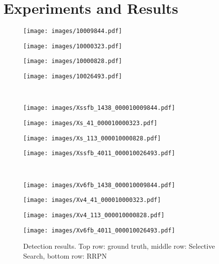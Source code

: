 \documentclass{article}
\begin{document}
\section{Experiments and Results}
\label{sec:exp}
\begin{figure*}[t]
\centering
  \begin{minipage}{0.24\linewidth}
    \texttt{[image: images/10009844.pdf]}
  \end{minipage}
  \begin{minipage}{0.24\linewidth}
    \texttt{[image: images/10000323.pdf]}
  \end{minipage}
  \begin{minipage}{0.24\linewidth}
    \texttt{[image: images/10000828.pdf]}
  \end{minipage}
  \begin{minipage}{0.24\linewidth}
    \texttt{[image: images/10026493.pdf]}
  \end{minipage}\\
  \begin{minipage}{0.24\linewidth}
    \texttt{[image: images/Xssfb\_1438\_000010009844.pdf]}
  \end{minipage}
  \begin{minipage}{0.24\linewidth}
    \texttt{[image: images/Xs\_41\_000010000323.pdf]}
  \end{minipage}
  \begin{minipage}{0.24\linewidth}
    \texttt{[image: images/Xs\_113\_000010000828.pdf]}
  \end{minipage}
  \begin{minipage}{0.24\linewidth}
    \centering
    \texttt{[image: images/Xssfb\_4011\_000010026493.pdf]}
  \end{minipage}\\
  \begin{minipage}{0.24\linewidth}
    \texttt{[image: images/Xv6fb\_1438\_000010009844.pdf]}
  \end{minipage}
  \begin{minipage}{0.24\linewidth}
    \texttt{[image: images/Xv4\_41\_000010000323.pdf]}
  \end{minipage}
  \begin{minipage}{0.24\linewidth}
    \texttt{[image: images/Xv4\_113\_000010000828.pdf]}
  \end{minipage}
  \begin{minipage}{0.24\linewidth}
    \texttt{[image: images/Xv6fb\_4011\_000010026493.pdf]}
  \end{minipage}
  \caption{Detection results. Top row: ground truth, middle row: Selective Search, bottom row: RRPN}
  \label{fig:detectionResults}
\end{figure*}
\end{document}
